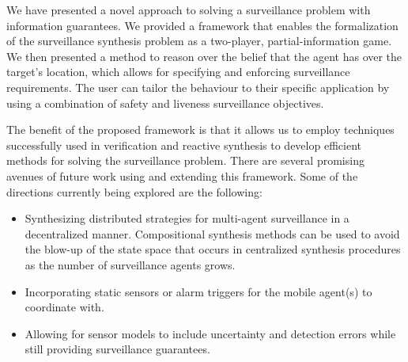 We have presented a novel approach to solving a surveillance problem with information guarantees. We provided a framework that enables the  formalization of the surveillance synthesis problem as a two-player, partial-information game. We then presented a method to reason over the belief that the agent has over the target's location, which allows for specifying and enforcing surveillance requirements. The user can tailor the behaviour to their specific application by using a combination of safety and liveness surveillance objectives.

The benefit of the proposed framework is that it allows us to employ techniques successfully used in verification and reactive synthesis to develop efficient methods for solving the surveillance problem. There are several promising  avenues of future work using and extending this framework. Some of the directions currently being explored are the following:
\begin{itemize}
\item Synthesizing distributed strategies for multi-agent surveillance in a decentralized manner. Compositional synthesis methods can be used to avoid  the blow-up of the state space that occurs in centralized synthesis procedures as the number of surveillance agents grows.
\item Incorporating static sensors or alarm triggers for the mobile agent(s) to coordinate with.
\item Allowing for sensor models to include uncertainty and detection errors while still providing surveillance guarantees.

\end{itemize}